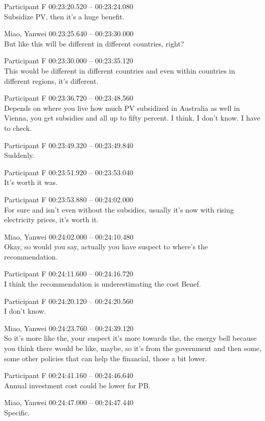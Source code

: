 {Participant F 00:23:20.520 -- 00:23:24.080 \\
Subsidize PV, then it's a huge benefit.

Miao, Yanwei 00:23:25.640 -- 00:23:30.000 \\
But like this will be different in different countries, right?

Participant F 00:23:30.000 -- 00:23:35.120 \\
This would be different in different countries and even within countries in different regions, it's different.

Participant F 00:23:36.720 -- 00:23:48.560 \\
Depends on where you live how much PV subsidized in Australia as well in Vienna, you get subsidies and all up to fifty percent. I think, I don't know. I have to check.

Participant F 00:23:49.320 -- 00:23:49.840 \\
Suddenly.

Participant F 00:23:51.920 -- 00:23:53.040 \\
It's worth it was.

Participant F 00:23:53.880 -- 00:24:02.000 \\
For sure and isn't even without the subsidies, usually it's now with rising electricity prices, it's worth it.

Miao, Yanwei 00:24:02.000 -- 00:24:10.480 \\
Okay, so would you say, actually you have suspect to where's the recommendation.

Participant F 00:24:11.600 -- 00:24:16.720 \\
I think the recommendation is underestimating the cost Benef.

Participant F 00:24:20.120 -- 00:24:20.560 \\
I don't know.

Miao, Yanwei 00:24:23.760 -- 00:24:39.120 \\
So it's more like the, your suspect it's more towards the, the energy bell because you think there would be like, maybe, so it's from the government and then some, some other policies that can help the financial, those a bit lower.

Participant F 00:24:41.160 -- 00:24:46.640 \\
Annual investment cost could be lower for PB.

Miao, Yanwei 00:24:47.000 -- 00:24:47.440 \\
Specific.

}
